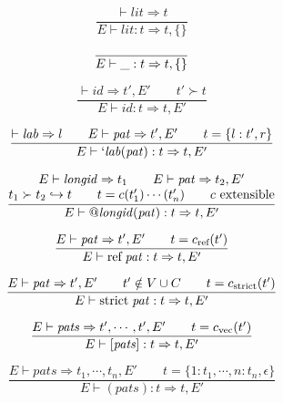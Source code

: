 \documentclass[twoside]{article}
\newcommand{\conarrow}{\hookrightarrow}
\newcommand{\x}[1]{\mathit{#1}}
\newcommand{\f}[1]{\mbox{#1}}
\renewcommand{\c}[1]{c_{\f{\scriptsize #1}}}
\newcommand{\lab}{\x{lab}}
\newcommand{\id}{\x{id}}
\newcommand{\longid}{\x{longid}}
\newcommand{\lit}{\x{lit}}
\newcommand{\pat}{\x{pat}}
\newcommand{\pats}{\x{pats}}
\begin{document}
\begin{equation}
\frac{
\vdash \lit \Rightarrow t
}{
E \vdash \lit : t \Rightarrow t,\{\}
}
\end{equation}

\begin{equation}
\frac{
}{
E \vdash \f{\_} : t \Rightarrow t,\{\}
}
\end{equation}

\begin{equation}
\frac{
\vdash \id \Rightarrow t',E'
\qquad
t' \succ t
}{
E \vdash \id : t \Rightarrow t,E'
}
\end{equation}

\begin{equation}
\frac{
\vdash \lab \Rightarrow l
\qquad
E \vdash \pat \Rightarrow t',E'
\qquad
t = \{l:t',r\}
}{
E \vdash `\lab(\pat) : t \Rightarrow t,E'
}
\end{equation}

\begin{equation}
\frac{
\begin{array}{@{}c@{}}
E \vdash \longid \Rightarrow t_1
\qquad
E \vdash \pat \Rightarrow t_2,E'
\\
t_1 \succ t_2 \conarrow t
\qquad
t = c(t_1')\cdots(t_n')
\qquad
\mbox{$c$ extensible}
\end{array}
}{
E \vdash @\longid(\pat) : t \Rightarrow t,E'
}
\end{equation}

\begin{equation}
\frac{
E \vdash \pat \Rightarrow t',E'
\qquad
t = \c{ref}(t')
}{
E \vdash \f{ref}\;\pat : t \Rightarrow t,E'
}
\end{equation}

\begin{equation}
\frac{
E \vdash \pat \Rightarrow t',E'
\qquad
t' \notin V \cup C
\qquad
t = \c{strict}(t')
}{
E \vdash \f{strict}\;\pat : t \Rightarrow t,E'
}
\end{equation}

\begin{equation}
\frac{
E \vdash \pats \Rightarrow t',\cdots,t',E'
\qquad
t = \c{vec}(t')
}{
E \vdash [\pats] : t \Rightarrow t,E'
}
\end{equation}

\begin{equation}
\frac{
E \vdash \pats \Rightarrow t_1,\cdots,t_n,E'
\qquad
t = \{1:t_1,\cdots,n:t_n,\epsilon\}
}{
E \vdash (\pats) : t \Rightarrow t,E'
}
\end{equation}
\end{document}
